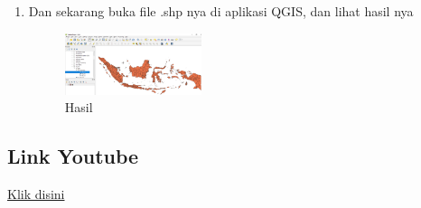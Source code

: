 \begin{enumerate}
 
  \item Dan sekarang buka file .shp nya di aplikasi QGIS, dan lihat hasil nya
  \hfill\break
  \begin{figure}[H]
  \includegraphics[width=4cm]{figures/1174005/4/14.png}
  \centering
  \caption{Hasil}
  \end{figure}
\end{enumerate}
\subsection{Link Youtube}
\href{https://https://youtu.be/TKXb3VWlzbU}{Klik disini}
